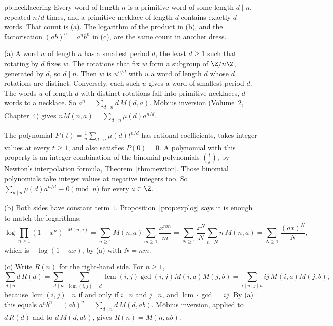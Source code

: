 \begin{solution}{pb:necklacering}
\idea Every word of length $n$ is a primitive word of some length $d\mid n$, repeated $n/d$ times, and a primitive necklace of length $d$ contains exactly $d$ words. That count is (a). The logarithm of the product in (b), and the factorisation $(ab)^n=a^nb^n$ in (c), are the same count in another dress.

\writeup (a) A word $w$ of length $n$ has a smallest period $d$, the least $d\ge1$ such that rotating by $d$ fixes $w$. The
rotations that fix $w$ form a subgroup of $\Z/n\Z$, generated by $d$, so $d\mid n$. Then $w$ is $u^{n/d}$ with $u$ a word of length
$d$ whose $d$ rotations are distinct. Conversely, each such $u$ gives a word of smallest period $d$. The words $u$ of length $d$
with distinct rotations fall into primitive necklaces, $d$ words to a necklace. So $a^n=\sum_{d\mid n}d\,M(d,a)$. Möbius
inversion (Volume~2, Chapter~4) gives $nM(n,a)=\sum_{d\mid n}\mu(d)a^{n/d}$.

The polynomial $P(t)=\frac1n\sum_{d\mid n}\mu(d)t^{n/d}$ has rational coefficients, takes integer values at every $t\ge1$, and also satisfies $P(0)=0$.
A polynomial with this property is an integer combination of the binomial polynomials $\binom tj$, by Newton's interpolation
formula, Theorem~\ref{thm:newton}. Those binomial polynomials take integer values at negative integers too. So $\sum_{d\mid n}\mu(d)a^{n/d}\equiv0\pmod n$
for every $a\in\Z$.

(b) Both sides have constant term $1$. Proposition~\ref{prop:explog} says it is enough to match the logarithms:
\[
\log\prod_{n\ge1}(1-x^n)^{-M(n,a)}=\sum_{n\ge1}M(n,a)\sum_{m\ge1}\frac{x^{nm}}m=\sum_{N\ge1}\frac{x^N}N\sum_{n\mid N}n\,M(n,a)
=\sum_{N\ge1}\frac{(ax)^N}N,
\]
which is $-\log(1-ax)$, by (a) with $N=nm$.

(c) Write $R(n)$ for the right-hand side. For $n\ge1$,
\[
\sum_{d\mid n}d\,R(d)=\sum_{d\mid n}\ \sum_{\operatorname{lcm}(i,j)=d}\operatorname{lcm}(i,j)\gcd(i,j)M(i,a)M(j,b)=\sum_{i\mid n,\ j\mid n}ij\,M(i,a)M(j,b),
\]
because $\operatorname{lcm}(i,j)\mid n$ if and only if $i\mid n$ and $j\mid n$, and $\operatorname{lcm}\cdot\gcd=ij$. By (a) this equals
$a^nb^n=(ab)^n=\sum_{d\mid n}d\,M(d,ab)$. Möbius inversion, applied to $d\,R(d)$ and to $d\,M(d,ab)$, gives $R(n)=M(n,ab)$.


\end{solution}
